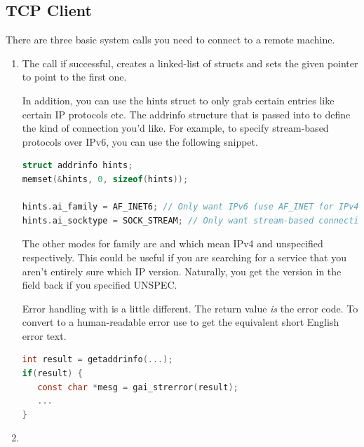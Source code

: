 \subsection{TCP Client}

There are three basic system calls you need to connect to a remote machine.

\begin{enumerate}

\item {}

The  call if successful, creates a linked-list of  structs and sets the given pointer to point to the first one.

In addition, you can use the hints struct to only grab certain entries like certain IP protocols etc.
The addrinfo structure that is passed into  to define the kind of connection you'd like.
For example, to specify stream-based protocols over IPv6, you can use the following snippet.

\begin{lstlisting}[language=C]
struct addrinfo hints;
memset(&hints, 0, sizeof(hints));

hints.ai_family = AF_INET6; // Only want IPv6 (use AF_INET for IPv4)
hints.ai_socktype = SOCK_STREAM; // Only want stream-based connection
\end{lstlisting}

The other modes for family are  and  which mean IPv4 and unspecified respectively.
This could be useful if you are searching for a service that you aren't entirely sure which IP version.
Naturally, you get the version in the field back if you specified UNSPEC.

Error handling with  is a little different.
The return value \emph{is} the error code.
To convert to a human-readable error use  to get the equivalent short English error text.

\begin{lstlisting}[language=C]
int result = getaddrinfo(...);
if(result) {
   const char *mesg = gai_strerror(result);
   ...
}
\end{lstlisting}


\item {}


\end{enumerate}
